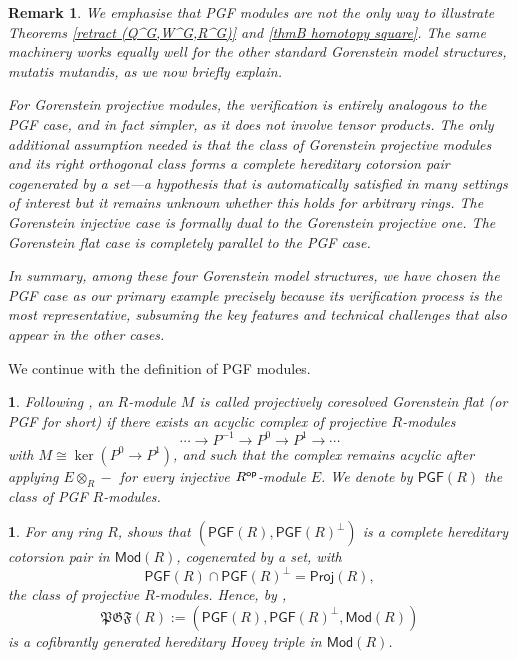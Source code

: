\documentclass[12pt,twoside]{amsart}
\theoremstyle{bfupright head,slanted body}
\theoremstyle{bfupright head,upright body}
\theoremstyle{fixed bf head,slanted body}
\theoremstyle{fixed bf head,upright body}
\newtheorem{rmk}[res]{Remark}           \newtheorem*{rmk*}{Remark}
\theoremstyle{numbered paragraph}
\newtheorem{ipg}[res]{}
\newcommand{\thmcite}[2][?]{\cite[Theorem~#1]{#2}}
\numberwithin{equation}{res}
\newcommand{\PGF}{\mathsf{PGF}}
\newcommand{\Proj}{\mathsf{Proj}}
\newcommand{\Mod}{\mathsf{Mod}}
\newcommand{\Rop}{R^{\sf op}}
\begin{document}
\begin{rmk} \label{rmk for G homo modules}
We emphasise that PGF modules are not the only way to illustrate Theorems \ref{retract (Q^G,W^G,R^G)} and \ref{thmB homotopy square}.
The same machinery works equally well for the other standard Gorenstein model structures, mutatis mutandis, as we now briefly explain.

For Gorenstein projective modules, the verification is entirely analogous to the PGF case, and in fact simpler, as it does not involve tensor products.
The only additional assumption needed is that the class of Gorenstein projective modules and its right orthogonal class forms a complete hereditary cotorsion pair cogenerated by a set---a hypothesis that is automatically satisfied in many settings of interest but it remains unknown whether this holds for arbitrary rings.
The Gorenstein injective case is formally dual to the Gorenstein projective one.
The Gorenstein flat case is completely parallel to the PGF case.

In summary, among these four Gorenstein model structures, we have chosen the PGF case as our primary example precisely because its verification process is the most representative, subsuming the key features and technical challenges that also appear in the other cases.
\end{rmk}

We continue with the definition of PGF modules.

\begin{ipg}
Following \cite{2020Sto}, an \(R\)-module \(M\) is called \emph{projectively coresolved Gorenstein flat} (or PGF for short) if there exists an acyclic complex of projective \(R\)-modules
\[
\cdots \to P^{-1} \to P^0 \to P^1 \to \cdots
\]
with \(M\cong \ker(P^0\to P^1)\), and such that the complex remains acyclic after applying \(E\otimes_R-\) for every injective \(\Rop\)-module \(E\). We denote by \(\PGF(R)\) the class of PGF \(R\)-modules.
\end{ipg}

\begin{ipg}\label{exa of Goren}
For any ring \(R\), \thmcite[4.9]{2020Sto} shows that \((\PGF(R),\PGF(R)^\bot)\) is a complete hereditary cotorsion pair in \(\Mod(R)\), cogenerated by a set, with
\[
\PGF(R)\cap\PGF(R)^\bot=\Proj(R),
\]
the class of projective \(R\)-modules. Hence, by \thmcite[1.1]{HOWTO},
\[
\mathfrak{PGF}(R):=(\PGF(R),\PGF(R)^\bot,\Mod(R))
\]
is a cofibrantly generated hereditary Hovey triple in \(\Mod(R)\).
\end{ipg}
\end{document}
